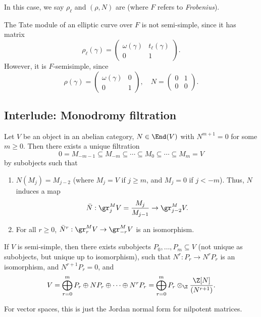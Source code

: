 \documentclass[a4paper]{article}
\begin{document}
In this case, we say $\rho_\ell$ and $(\rho, N)$ are  (where $F$ refers to \emph{Frobenius}).

\begin{eg}
  The Tate module of an elliptic curve over $F$ is not semi-simple, since it has matrix
  \[
    \rho_\ell(\gamma) =
    \begin{pmatrix}
      \omega(\gamma) & t_\ell(\gamma)\\
      0 & 1
    \end{pmatrix}.
  \]
  However, it is $F$-semisimple, since
  \[
    \rho(\gamma) =
    \begin{pmatrix}
      \omega(\gamma) & 0\\
      0 & 1
    \end{pmatrix},\quad N =
    \begin{pmatrix}
      0 & 1\\
      0 & 0
    \end{pmatrix}.
  \]
\end{eg}
\subsection{Interlude: Monodromy filtration}
\begin{thm}
  Let $V$ be an object in an abelian category, $N \in \End(V)$ with $N^{m + 1} = 0$ for some $m \geq 0$. Then there exists a unique filtration
  \[
    0 = M_{-m - 1} \subseteq M_{-m} \subseteq \cdots \subseteq M_0 \subseteq \cdots \subseteq M_m = V
  \]
  by subobjects such that
  \begin{enumerate}
    \item $N(M_j) = M_{j - 2}$ (where $M_j = V$ if $j \geq m$, and $M_j = 0$ if $j < -m$). Thus, $N$ induces a map
      \[
        \bar{N}: \gr_j^M V = \frac{M_j}{M_{j - 1}} \to \gr_{j - 2}^M V.
      \]
    \item For all $r \geq 0$, $\bar{N}^r: \gr_r^M V \to \gr_{-r}^M V$ is an isomorphism.
  \end{enumerate}
\end{thm}

\begin{cor}
  If $V$ is semi-simple, then there exists subobjects $P_0, \ldots, P_m \subseteq V$ (not unique as subobjects, but unique up to isomorphism), such that $N^r: P_r \to N^r P_r$ is an isomorphism, and $N^{r + 1} P_r = 0$, and
  \[
    V = \bigoplus_{r = 0}^m P_r \oplus N P_r \oplus \cdots \oplus N^r P_r = \bigoplus_{r = 0}^m P_r \otimes_\Z \frac{\Z[N]}{(N^{r + 1})}.
  \]
\end{cor}
For vector spaces, this is just the Jordan normal form for nilpotent matrices.
\end{document}
